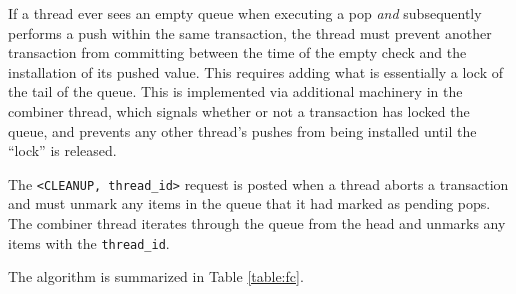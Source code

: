 If a thread ever sees an empty queue when executing a pop \emph{and} subsequently performs a push within the same transaction, the thread must prevent another transaction from committing between the time of the empty check and the installation of its pushed value. This requires adding what is essentially a lock of the tail of the queue. This is implemented via additional machinery in the combiner thread, which signals whether or not a transaction has locked the queue, and prevents any other thread's pushes from being installed until the ``lock'' is released.

The \texttt{<CLEANUP, thread\_id>} request is posted when a thread aborts a transaction and must unmark any items in the queue that it had marked as pending pops. The combiner thread iterates through the queue from the head and unmarks any items with the \texttt{thread\_id}.

The algorithm is summarized in Table \ref{table:fc}.



